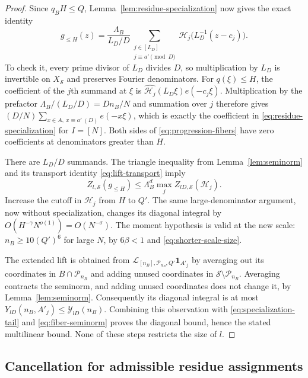 \begin{proof}
Since $q_BH\le Q$, Lemma~\ref{lem:residue-specialization} now gives the
exact identity
\begin{equation}\label{eq:progression-fibers}
 g_{\le H}(z)=\frac{\Lambda_B}{L_D/D}
       \sum_{\substack{j\in[L_D]\\j\equiv a'\pmod D}}
       \mathcal H_j\bigl(L_D^{-1}(z-c_j)\bigr).
\end{equation}
To check it, every prime divisor of $L_D$ divides $D$, so multiplication
by $L_D$ is invertible on $X_{\mathcal S}$ and preserves Fourier
denominators.  For $q(\xi)\le H$, the coefficient of the $j$th summand at $\xi$ is
$\widehat{\mathcal H_j}(L_D\xi)e(-c_j\xi)$.  Multiplication by the prefactor
$\Lambda_B/(L_D/D)=Dn_B/N$ and summation over $j$ therefore gives
$(D/N)\sum_{x\in A,\ x\equiv a'\ (D)}e(-x\xi)$, which is exactly the
coefficient in \eqref{eq:residue-specialization} for $I=[N]$.
Both sides of \eqref{eq:progression-fibers} have zero coefficients at
denominators greater than $H$.

There are $L_D/D$ summands.  The triangle inequality from
Lemma~\ref{lem:seminorm} and its transport identity
\eqref{eq:lift-transport} imply
\begin{equation}\label{eq:fiber-seminorm}
 Z_{l,\mathcal S}(g_{\le H})
       \le\Lambda_B^d\max_j Z_{lD,\mathcal S}(\mathcal H_j).
\end{equation}
Increase the cutoff in $\mathcal H_j$ from $H$ to $Q'$.  The same
large-denominator argument, now without specialization, changes its
diagonal integral by $O(H^{-\gamma}N^{o(1)})=O(N^{-\sigma})$.
The moment hypothesis is valid at the new scale:
$n_B\ge10(Q')^6$ for large $N$, by $6\beta<1$ and
\eqref{eq:shorter-scale-size}.

The extended lift is obtained from
$\mathcal L_{[n_B],\mathcal P_{n_B},Q'}\mathbf1_{A'_j}$ by averaging out
its coordinates in $B\cap\mathcal P_{n_B}$ and adding unused coordinates
in $\mathcal S\setminus\mathcal P_{n_B}$.  Averaging contracts the
seminorm, and adding unused coordinates does not change it, by
Lemma~\ref{lem:seminorm}.  Consequently its diagonal integral is at most
$Y_{lD}(n_B,A'_j)\le\mathcal Y_{lD}(n_B)$.
Combining this observation with \eqref{eq:specialization-tail} and
\eqref{eq:fiber-seminorm} proves the diagonal bound, hence the stated
multilinear bound.  None of these steps restricts the size of $l$.
\end{proof}

\subsection{Cancellation for admissible residue assignments}

